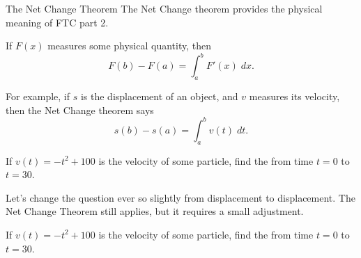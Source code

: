 \documentclass[../main.tex]{subfiles}
\begin{document}
\begin{lesson}{The Net Change Theorem}
  The Net Change theorem provides the physical meaning of FTC part 2.

  \begin{mdframed}[style=withref-compact]
    If \(F(x)\) measures some physical quantity, then 
    \[
      F(b) - F(a) = \int_{a}^{b} F'(x) \;dx.
    \]

  \end{mdframed}

  For example, if \(s\) is the displacement of an object, and \(v\) measures its velocity, then the Net Change theorem says 
  \[
    s(b) - s(a) = \int_{a}^{b} v(t) \;dt.
  \]

  \begin{example}
    If \(v(t) = -t^{2} + 100\) is the velocity of some particle, find the  from time \(t = 0\) to \(t = 30\).
  \end{example}
  \clearpage

  Let's change the question ever so slightly from  displacement to  displacement. The Net Change Theorem still applies, but it requires a small adjustment.
  \begin{example}
    If \(v(t) = -t^{2} + 100\) is the velocity of some particle, find the  from time \(t = 0\) to \(t = 30\).
  \end{example}
\end{lesson}
\end{document}
